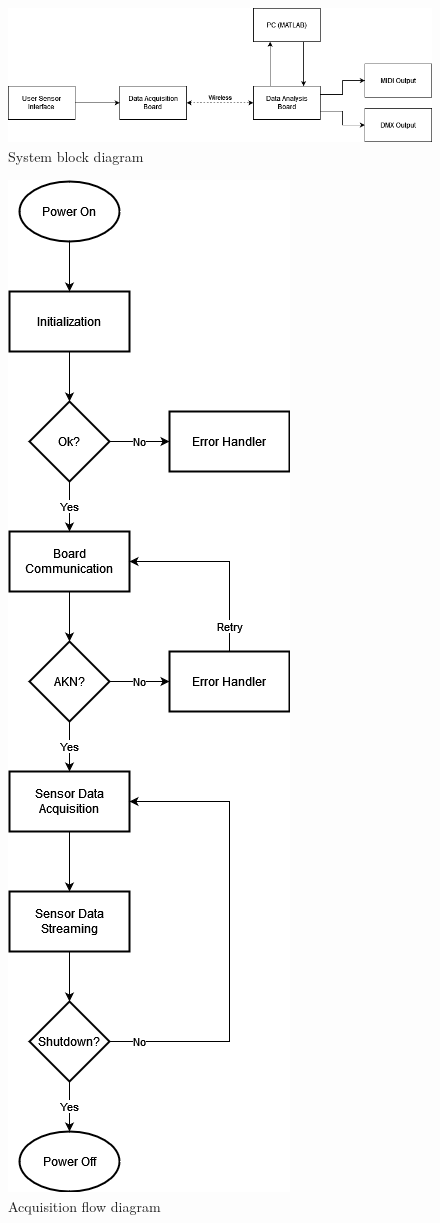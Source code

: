 \begin{figure}[!ht]
    \caption{System block diagram}\label{fig:block}
    \centering
    \includegraphics[width=1\columnwidth]{project_plan/figures/System_Block_Diagram}
\end{figure}

\begin{figure}[!ht]
    \caption{Acquisition flow diagram}\label{fig:acquisition}
    \centering
    \includegraphics[scale=0.40]{project_plan/figures/Acquisition_Flow_Diagram}

\end{figure}
